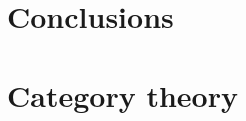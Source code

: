 \documentclass[aps,twocolumn]{revtex4-1}
\begin{document}
\section{Conclusions}


 



\appendix

\section{Category theory}\label{app:CatTh}


%
\end{document}
